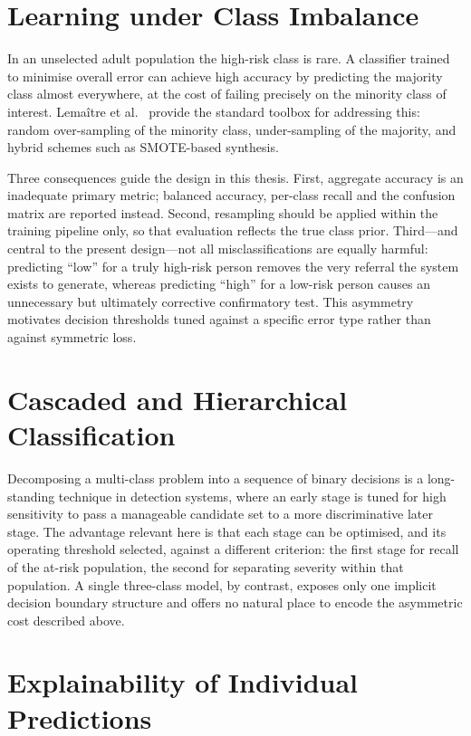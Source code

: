 \section{Learning under Class Imbalance}
\label{sec:imbalance}

In an unselected adult population the high-risk class is rare. A classifier
trained to minimise overall error can achieve high accuracy by predicting the
majority class almost everywhere, at the cost of failing precisely on the
minority class of interest. Lema\^{i}tre et al.\ \cite{lemaitre2017} provide the
standard toolbox for addressing this: random over-sampling of the minority
class, under-sampling of the majority, and hybrid schemes such as SMOTE-based
synthesis.

Three consequences guide the design in this thesis. First, aggregate accuracy is
an inadequate primary metric; balanced accuracy, per-class recall and the
confusion matrix are reported instead. Second, resampling should be applied
within the training pipeline only, so that evaluation reflects the true class
prior. Third---and central to the present design---not all misclassifications
are equally harmful: predicting ``low'' for a truly high-risk person removes
the very referral the system exists to generate, whereas predicting ``high''
for a low-risk person causes an unnecessary but ultimately corrective
confirmatory test. This asymmetry motivates decision thresholds tuned against a
specific error type rather than against symmetric loss.

\section{Cascaded and Hierarchical Classification}
\label{sec:cascade_lit}

Decomposing a multi-class problem into a sequence of binary decisions is a
long-standing technique in detection systems, where an early stage is tuned for
high sensitivity to pass a manageable candidate set to a more discriminative
later stage. The advantage relevant here is that each stage can be optimised,
and its operating threshold selected, against a different criterion: the first
stage for recall of the at-risk population, the second for separating severity
within that population. A single three-class model, by contrast, exposes only
one implicit decision boundary structure and offers no natural place to encode
the asymmetric cost described above.

\section{Explainability of Individual Predictions}
\label{sec:xai}

